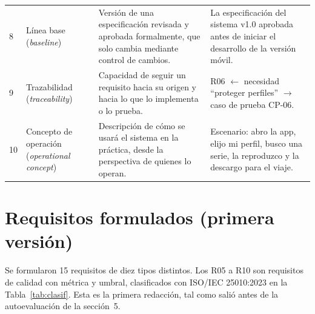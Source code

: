 \documentclass[11pt,a4paper]{article}
\begin{document}
\begin{longtable}{@{}p{0.5cm}p{2.6cm}p{5.7cm}p{5.6cm}@{}}
8 & L\'inea base (\emph{baseline}) & Versi\'on de una especificaci\'on revisada y aprobada formalmente, que solo cambia mediante control de cambios. & La especificaci\'on del sistema v1.0 aprobada antes de iniciar el desarrollo de la versi\'on m\'ovil.\\
9 & Trazabilidad (\emph{traceability}) & Capacidad de seguir un requisito hacia su origen y hacia lo que lo implementa o lo prueba. & R06 $\leftarrow$ necesidad ``proteger perfiles'' $\rightarrow$ caso de prueba CP-06.\\
10 & Concepto de operaci\'on (\emph{operational concept}) & Descripci\'on de c\'omo se usar\'a el sistema en la pr\'actica, desde la perspectiva de quienes lo operan. & Escenario: abro la app, elijo mi perfil, busco una serie, la reproduzco y la descargo para el viaje.\\
\bottomrule
\end{longtable}

\section{Requisitos formulados (primera versi\'on)}
Se formularon 15 requisitos de diez tipos distintos. Los R05 a R10 son requisitos de calidad con m\'etrica y umbral, clasificados con ISO/IEC 25010:2023 en la Tabla~\ref{tab:clasif}. Esta es la primera redacci\'on, tal como sali\'o antes de la autoevaluaci\'on de la secci\'on~5.
\end{document}
